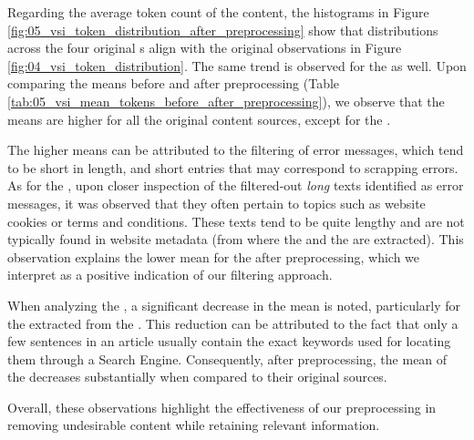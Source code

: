 


Regarding the average token count of the content, the histograms in Figure \ref{fig:05_vsi_token_distribution_after_preprocessing} show that distributions across the four original \contentType{}s align with the original observations in Figure \ref{fig:04_vsi_token_distribution}. The same trend is observed for the \keyphrases{} as well. Upon comparing the means before and after preprocessing (Table \ref{tab:05_vsi_mean_tokens_before_after_preprocessing}), we observe that the means are higher for all the original content sources, except for the \trafilaturaFulltext{}.

The higher means can be attributed to the filtering of error messages, which tend to be short in length, and short entries that may correspond to scrapping errors. As for the \trafilaturaFulltext{}, upon closer inspection of the filtered-out \emph{long} texts identified as error messages, it was observed that they often pertain to topics such as website cookies or terms and conditions. These texts tend to be quite lengthy and are not typically found in website metadata (from where the \trafilaturaTitle{} and the \trafilaturaAbstract{} are extracted). This observation explains the lower mean for the \trafilaturaFulltext{} after preprocessing, which we interpret as a positive indication of our filtering approach.

When analyzing the \keyphrases{}, a significant decrease in the mean is noted, particularly for the \keyphrases{} extracted from the \trafilaturaFulltext{}. This reduction can be attributed to the fact that only a few sentences in an article usually contain the exact keywords used for locating them through a  Search Engine. Consequently, after preprocessing, the mean of the \keyphrases{} decreases substantially when compared to their original sources.

Overall, these observations highlight the effectiveness of our preprocessing in removing undesirable content while retaining relevant information.





